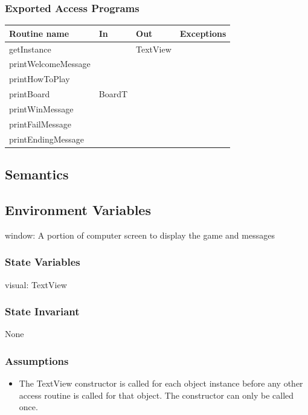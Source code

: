 \documentclass[12pt]{article}
\begin{document}
\subsubsection* {Exported Access Programs}

\begin{tabular}{| l | l | l | p{6cm} |}
\hline
\textbf{Routine name} & \textbf{In} & \textbf{Out} & \textbf{Exceptions}\\
\hline
getInstance & ~ & TextView &  \\
\hline
printWelcomeMessage & ~ & ~ & \\
\hline
printHowToPlay & ~ & ~ & \\
\hline
printBoard & BoardT & ~ & \\
\hline
printWinMessage & ~ & ~ & \\
\hline
printFailMessage & ~ & ~ & \\
\hline
printEndingMessage & ~ & ~ & \\
\hline
\end{tabular}

\subsection* {Semantics}

\subsection*{Environment Variables}

window: A portion of computer screen to display the game and messages

\subsubsection* {State Variables}

visual: TextView

\subsubsection* {State Invariant}

None

\subsubsection* {Assumptions}

\begin{itemize}
\item The TextView constructor is called for each object instance before any
other access routine is called for that object. The constructor can only be
called once.
\end{itemize}
\end{document}
